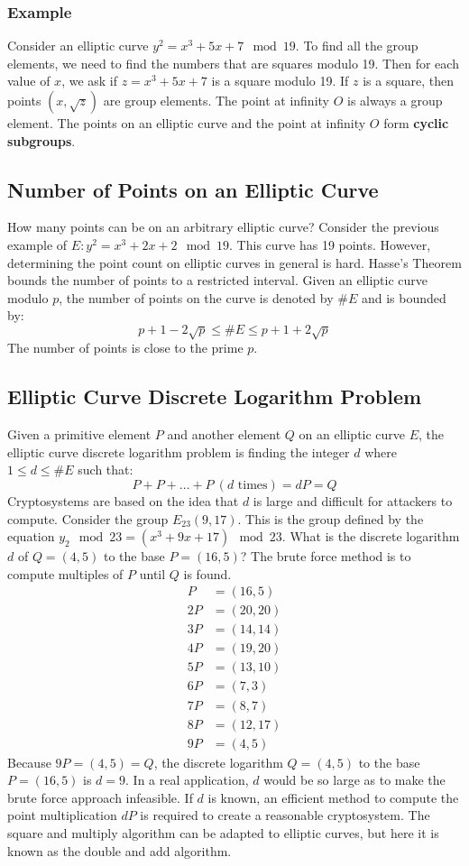 \documentclass{math}
\begin{document}
\subsubsection*{Example}
Consider an elliptic curve \( y^2 = x^3+5x+7\mod19 \). To find all the group
elements, we need to find the numbers that are squares modulo 19. Then for each
value of \( x \), we ask if \( z = x^3+5x+7 \) is a square modulo 19. If \( z \)
is a square, then points \( (x,\sqrt{z}) \) are group elements. The point at
infinity \( O \) is always a group element. The points on an elliptic curve and
the point at infinity \( O \) form \textbf{cyclic subgroups}.

\subsection*{Number of Points on an Elliptic Curve}
How many points can be on an arbitrary elliptic curve? Consider the previous
example of \( E: y^2 = x^3+2x+2\mod19 \). This curve has 19 points. However,
determining the point count on elliptic curves in general is hard. Hasse's
Theorem bounds the number of points to a restricted interval. Given an
elliptic curve modulo \( p \), the number of points on the curve is denoted by
\( \#E \) and is bounded by:
\[ p+1-2\sqrt{p} \le \#E \le p+1+2\sqrt{p} \]
The number of points is close to the prime \( p \).

\subsection*{Elliptic Curve Discrete Logarithm Problem}
Given a primitive element \( P \) and another element \( Q \) on an elliptic
curve \( E \), the elliptic curve discrete logarithm problem is finding the
integer \( d \) where \( 1\le d\le \#E \) such that:
\[ P+P+\dots+P ~(d\text{ times}) = dP = Q \]
Cryptosystems are based on the idea that \( d \) is large and difficult for
attackers to compute. Consider the group \( E_23(9,17) \). This is the group
defined by the equation \( y_2\mod23 = (x^3+9x+17)\mod23 \). What is the
discrete logarithm \( d \) of \( Q = (4,5) \) to the base \( P = (16,5) \)?
The brute force method is to compute multiples of \( P \) until \( Q \) is
found.
\begin{align*}
  P &= (16,5) \\
  2P &= (20,20) \\
  3P &= (14,14) \\
  4P &= (19,20) \\
  5P &= (13,10) \\
  6P &= (7,3) \\
  7P &= (8,7) \\
  8P &= (12,17) \\
  9P &= (4,5)
\end{align*}
Because \( 9P = (4,5) = Q \), the discrete logarithm \( Q = (4,5) \) to the
base \( P = (16,5) \) is \( d = 9 \). In a real application, \( d \) would be so
large as to make the brute force approach infeasible. If \( d \) is known, an
efficient method to compute the point multiplication \( dP \) is required to
create a reasonable cryptosystem. The square and multiply algorithm can be
adapted to elliptic curves, but here it is known as the double and add
algorithm.
\end{document}
